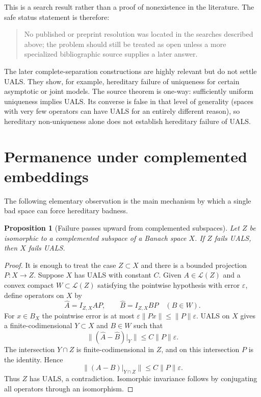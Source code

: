 \documentclass[11pt]{article}
\newtheorem{proposition}[theorem]{Proposition}
\theoremstyle{definition}
\theoremstyle{remark}
\newcommand{\LL}{\mathcal{L}}
\begin{document}
This is a search result rather than a proof of nonexistence in the literature.  The safe status statement is therefore:

\begin{quote}
No published or preprint resolution was located in the searches described above; the problem should still be treated as open unless a more specialized bibliographic source supplies a later answer.
\end{quote}

The later complete-separation constructions are highly relevant but do not settle UALS.  They show, for example, hereditary failure of uniqueness for certain asymptotic or joint models.  The source theorem is one-way: sufficiently uniform uniqueness implies UALS.  Its converse is false in that level of generality (spaces with very few operators can have UALS for an entirely different reason), so hereditary non-uniqueness alone does not establish hereditary failure of UALS.

\section{Permanence under complemented embeddings}

The following elementary observation is the main mechanism by which a single bad space can force hereditary badness.

\begin{proposition}[Failure passes upward from complemented subspaces]\label{prop:complemented}
Let $Z$ be isomorphic to a complemented subspace of a Banach space $X$.  If $Z$ fails UALS, then $X$ fails UALS.
\end{proposition}

\begin{proof}
It is enough to treat the case $Z\subset X$ and there is a bounded projection $P:X\to Z$.  Suppose $X$ has UALS with constant $C$.  Given $A\in\LL(Z)$ and a convex compact $W\subset\LL(Z)$ satisfying the pointwise hypothesis with error $\varepsilon$, define operators on $X$ by
\[
  \widehat A=I_{Z,X}AP,
  \qquad
  \widehat B=I_{Z,X}BP\quad(B\in W).
\]
For $x\in B_X$ the pointwise error is at most $\varepsilon\|Px\|\leq\|P\|\varepsilon$.  UALS on $X$ gives a finite-codimensional $Y\subset X$ and $B\in W$ such that
\[
  \|(\widehat A-\widehat B)|_Y\|\leq C\|P\|\varepsilon.
\]
The intersection $Y\cap Z$ is finite-codimensional in $Z$, and on this intersection $P$ is the identity.  Hence
\[
  \|(A-B)|_{Y\cap Z}\|\leq C\|P\|\varepsilon.
\]
Thus $Z$ has UALS, a contradiction.  Isomorphic invariance follows by conjugating all operators through an isomorphism.
\end{proof}
\end{document}
